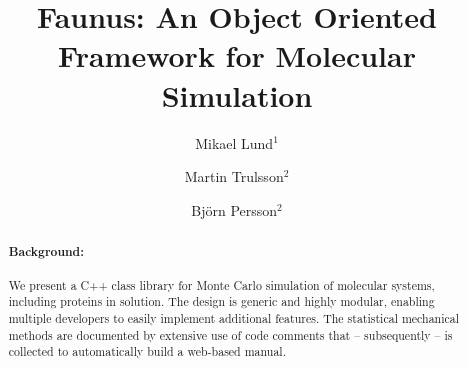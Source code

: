 \documentclass[10pt]{bmc_article}
\newenvironment{bmcformat}{\begin{raggedright}\baselineskip20pt\sloppy\setboolean{publ}{false}}{\end{raggedright}\baselineskip20pt\sloppy}
\begin{document}
\begin{bmcformat}



\title{Faunus: An Object Oriented Framework for Molecular Si\-mu\-la\-tion}
 


\author{
Mikael Lund\correspondingauthor$^{1}$%
\and
Martin Trulsson$^{2}$
\and
Bj\"orn Persson$^{2}$
      }
      

\address{%
    \iid(1) Institute of Organic Chemistry and Biochemistry, The Academy of Sciences of the Czech Republic, Flemingovo nam.2, CZ-16610 Prague 6, Czech Republic.
     \iid(2) Department of Theoretical Chemistry,
     University of Lund, P.O.B 124 SE-22100 Lund, Sweden.
}%
\maketitle

\begin{abstract}
        \paragraph*{Background:} We present a C++ class library for Monte Carlo simulation of molecular systems, including proteins in solution. The design is generic and highly modular, enabling multiple developers to easily implement additional features. The statistical mechanical methods are documented by extensive use of code comments that -- subsequently -- is collected to automatically build a web-based manual.

\end{abstract}
\end{bmcformat}
\end{document}
